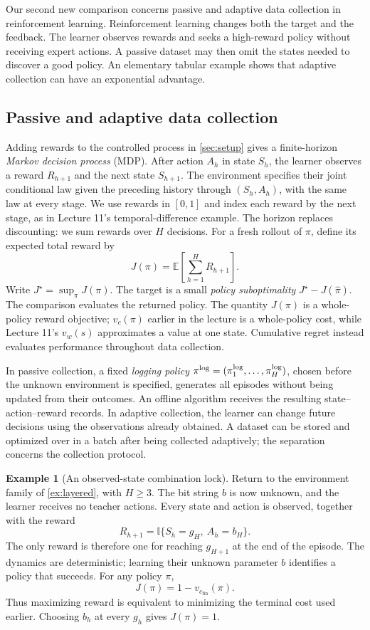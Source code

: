 \documentclass[11pt,twoside]{article}
\newcommand{\E}{\mathbb E}
\newcommand{\I}{\mathbb I}
\theoremstyle{definition}
\newtheorem{example}[theorem]{Example}
\theoremstyle{remark}
\begin{document}
Our second new comparison concerns passive and adaptive data collection
in reinforcement learning. Reinforcement learning changes both the target
and the feedback. The learner
observes rewards and seeks a high-reward policy without receiving expert
actions. A passive dataset may then omit the states needed to discover a
good policy. An elementary tabular example shows that adaptive collection
can have an exponential advantage.

\subsection{Passive and adaptive data collection}

Adding rewards to the controlled process in \cref{sec:setup} gives a
finite-horizon \emph{Markov decision process} (MDP). After action $A_h$
in state $S_h$, the learner observes a reward $R_{h+1}$ and the next state
$S_{h+1}$. The environment specifies their joint conditional law given
the preceding history through $(S_h,A_h)$, with the same law at every stage.
We use rewards in $[0,1]$ and index each reward by the next stage, as in
Lecture 11's temporal-difference example. The horizon replaces discounting:
we sum rewards over $H$ decisions.
For a fresh rollout of $\pi$, define its expected total reward by
\[
 J(\pi)=\E\!\left[\sum_{h=1}^H R_{h+1}\right].
\]
Write $J^\star=\sup_\pi J(\pi)$. The target is a small
\emph{policy suboptimality} $J^\star-J(\widehat\pi)$.
The comparison evaluates the returned policy. The quantity $J(\pi)$ is a
whole-policy reward objective; $v_c(\pi)$ earlier in the lecture is a
whole-policy cost, while Lecture 11's $v_w(s)$ approximates a value at one
state. Cumulative regret instead evaluates performance throughout data
collection.

In passive collection, a fixed \emph{logging policy}
$\pi^{\rm log}=(\pi_1^{\rm log},\ldots,\pi_H^{\rm log})$, chosen before
the unknown environment is specified, generates all episodes without being
updated from their outcomes. An offline algorithm receives
the resulting state--action--reward records. In adaptive collection, the
learner can change future decisions using the observations already obtained.
A dataset can be stored and optimized over in a batch after being collected
adaptively; the separation concerns the collection protocol.

\begin{example}[An observed-state combination lock]
\label{ex:lock}
Return to the environment family of \cref{ex:layered}, with $H\ge3$.
The bit string $b$ is now unknown, and the learner receives no teacher
actions. Every state and action is observed, together with the reward
\[
 R_{h+1}=\I\{S_h=g_H,\ A_h=b_H\}.
\]
The only reward is therefore one for reaching $g_{H+1}$ at the end of
the episode. The dynamics are deterministic; learning their unknown
parameter $b$ identifies a policy that succeeds. For any policy $\pi$,
\[
 J(\pi)=1-v_{c_{\mathrm{fin}}}(\pi).
\]
Thus maximizing reward is equivalent to minimizing the terminal cost used
earlier. Choosing $b_h$ at every $g_h$ gives $J(\pi)=1$.
\end{example}
\end{document}
